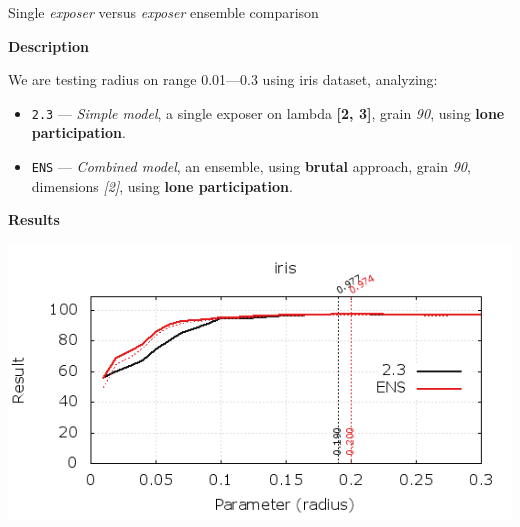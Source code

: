 \begin{experiment}{Single \emph{exposer} versus \emph{exposer} ensemble comparison}{\small \sffamily\textbf{Description}

We are testing radius on range 0.01---0.3 using iris dataset, analyzing:

\begin{itemize}
\tightlist
	\item \texttt{2.3} --- \emph{Simple model}, a single exposer on lambda \textbf{[2, 3]}, grain \emph{90}, using \textbf{lone participation}.
	\item \texttt{ENS} --- \emph{Combined model}, an ensemble, using \textbf{brutal} approach, grain \emph{90}, dimensions \emph{[2]}, using \textbf{lone participation}.

\end{itemize}


\textbf{Results}

\centering
	\includegraphics[width=.75\textwidth]{plots/experiment_3_iris.png}
	\label{fig:experiment_3}
}\end{experiment}